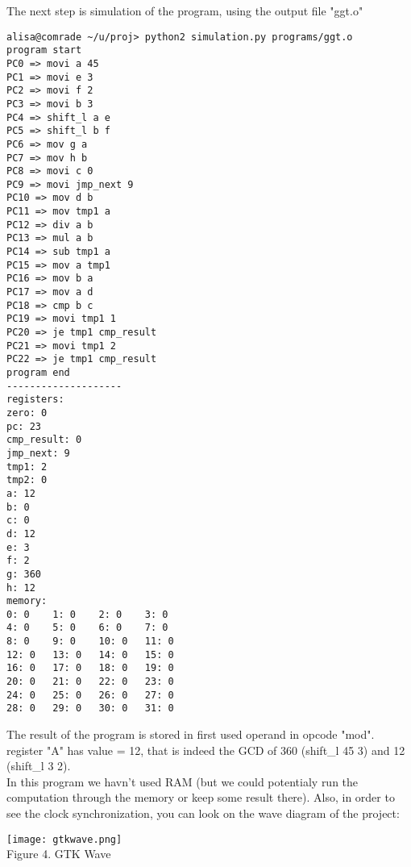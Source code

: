 \documentclass[11pt,a4paper]{article}
\begin{document}
The next step is simulation of the program, using the output file "ggt.o"
\begin{verbatim}
alisa@comrade ~/u/proj> python2 simulation.py programs/ggt.o
program start
PC0 => movi a 45
PC1 => movi e 3
PC2 => movi f 2
PC3 => movi b 3
PC4 => shift_l a e
PC5 => shift_l b f
PC6 => mov g a
PC7 => mov h b
PC8 => movi c 0
PC9 => movi jmp_next 9
PC10 => mov d b
PC11 => mov tmp1 a
PC12 => div a b
PC13 => mul a b
PC14 => sub tmp1 a
PC15 => mov a tmp1
PC16 => mov b a
PC17 => mov a d
PC18 => cmp b c
PC19 => movi tmp1 1
PC20 => je tmp1 cmp_result
PC21 => movi tmp1 2
PC22 => je tmp1 cmp_result
program end
--------------------
registers:
zero: 0
pc: 23
cmp_result: 0
jmp_next: 9
tmp1: 2
tmp2: 0
a: 12
b: 0
c: 0
d: 12
e: 3
f: 2
g: 360
h: 12
memory:
0: 0    1: 0    2: 0    3: 0
4: 0    5: 0    6: 0    7: 0
8: 0    9: 0    10: 0   11: 0
12: 0   13: 0   14: 0   15: 0
16: 0   17: 0   18: 0   19: 0
20: 0   21: 0   22: 0   23: 0
24: 0   25: 0   26: 0   27: 0
28: 0   29: 0   30: 0   31: 0
\end{verbatim}
The result of the program is stored in first used operand in opcode "mod". register "A" has value = 12, that is indeed the GCD of 360 (shift\_l 45 3) and 12 (shift\_l 3 2).\\
In this program we havn't used RAM (but we could potentialy run the computation through the memory or keep some result there).
Also, in order to see the clock synchronization, you can look on the wave diagram of the project:\\
\begin{center}
\texttt{[image: gtkwave.png]}\\
Figure 4. GTK Wave
\end{center}			
			
\newpage
\end{document}
